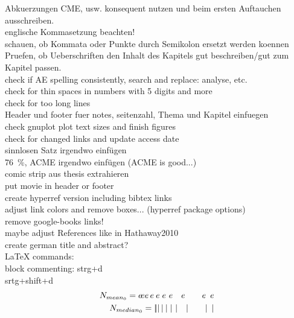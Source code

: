 	Abkuerzungen CME, usw. konsequent nutzen und beim ersten Auftauchen ausschreiben.\\

	englische Kommasetzung beachten!\\
	schauen, ob Kommata oder Punkte durch Semikolon ersetzt werden koennen\\
	Pruefen, ob Ueberschriften den Inhalt des Kapitels gut beschreiben/gut zum Kapitel passen.\\
	check if AE spelling consistently, search and replace: analyse, etc.\\
	check for thin spaces in numbers with 5 digits and more\\
	check for too long lines\\
	
	Header und footer fuer notes, seitenzahl, Thema und Kapitel einfuegen\\
	check gnuplot plot text sizes and finish figures\\
	
	check for changed links and update access date\\
	
	sinnlosen Satz irgendwo einfügen\\
	76~\%, ACME irgendwo einfügen (ACME is good...)\\
	comic strip aus thesis extrahieren\\
	put movie in header or footer\\

	create hyperref version including bibtex links\\
		adjust link colors and remove boxes... (hyperref package options)\\
		remove google-books links!\\
		maybe adjust References like in Hathaway2010\\

		
	create german title and abstract?\\


LaTeX commands:\\
block commenting: strg+d\\
srtg+shift+d\\

\begin{align}
	N_{mean_0} = e\!ee\,e\:e\;e\ e\quad e\qquad e\enskip e\\	%
	N_{median_0} = |\!||\,|\:|\;|\ |\quad|\qquad|\enskip|
\end{align}

